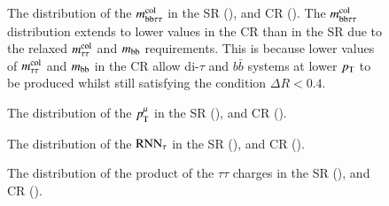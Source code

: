     \begin{figure}[htbp]
        \centering
        \caption{
            The distribution of the $m_\mathrm{bb\tau\tau}^\mathrm{col}$ in the SR (\protect{}), and CR (\protect{}).
            The $m_\mathrm{bb\tau\tau}^\mathrm{col}$ distribution extends to lower values in the CR than in the SR due to the relaxed $m_\mathrm{\tau\tau}^\mathrm{col}$ and $m_\mathrm{bb}$ requirements.  
            This is because lower values of $m_\mathrm{\tau\tau}^\mathrm{col}$ and $m_\mathrm{bb}$ in the CR allow di-$\tau$ and $b\bar{b}$ systems at 
            lower $p_{\text{T}}$ to be produced whilst still satisfying the condition $\Delta{R} < 0.4$.
        }
        \label{fig:mbbtt}
    \end{figure}
    \begin{figure}[htbp]
        
        \centering
        \caption{
            The distribution of the $p_{\text{T}}^\mathrm{\mu}$ in the SR (\protect{}), and CR (\protect{}).
        }
        \label{fig:pTmu}
    \end{figure}
    \begin{figure}[htbp]
        \centering
        \caption{
            The distribution of the $\mathrm{RNN}_\mathrm{\tau}$ in the SR (\protect{}), and CR (\protect{}).
        }
        \label{fig:tau_rnn}
    \end{figure}
    \begin{figure}[htbp]
        \centering
        \caption{
            The distribution of the product of the $\tau\tau$ charges in the SR (\protect{}), and CR (\protect{}).
        }
        \label{fig:qq}
    \end{figure}

